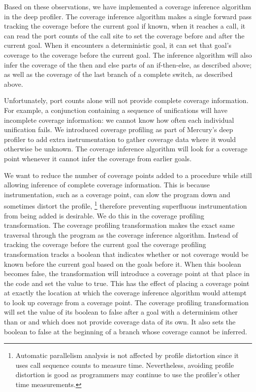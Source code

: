 Based on these observations,
we have implemented a coverage inference algorithm in the deep profiler.
The coverage inference algorithm makes a single forward pass
tracking the coverage before the current goal if known,
when it reaches a call,
it can read the port counts of the call site to set the coverage 
before and after the current goal.
When it encounters a deterministic goal,
it can set that goal's coverage to the coverage before the current goal.
The inference algorithm will also infer the coverage of the then and else
parts of an if-then-else, as described above;
as well as the coverage of the last branch of a complete switch,
as described above.

Unfortunately, port counts alone will not provide complete coverage
information.
For example, a conjunction containing a sequence of \dsemidet
unifications will have incomplete coverage information:
we cannot know how often each individual unification fails.
We introduced coverage profiling as part of Mercury's deep profiler to
add extra instrumentation to gather coverage data where it would
otherwise be unknown.
The coverage inference algorithm will look for a coverage point whenever
it cannot infer the coverage from earlier goals.

We want to reduce the number of coverage points added to a procedure while
still allowing inference of complete coverage information.
This is because instrumentation,
such as a coverage point,
can slow the program down and sometimes distort the profile,
\footnote{
    Automatic parallelism analysis is not affected by profile distortion
    since it uses call sequence counts to measure time.
    Nevertheless,
    avoiding profile distortion is good as
    programmers may continue to use the profiler's other
    time measurements.}
therefore preventing superfluous instrumentation from being added is
desirable.
We do this in the coverage profiling transformation.
The coverage profiling transformation makes the exact same traversal through
the program as the coverage inference algorithm.
Instead of tracking the coverage before the current goal
the coverage profiling transformation tracks a boolean that indicates
whether or not coverage would be known before the current goal based on the
goals before it.
When this boolean becomes false,
the transformation will introduce a coverage point at that place in the code
and set the value to true.
This has the effect of placing a coverage point at exactly the location at
which the coverage inference algorithm would attempt to look up coverage
from a coverage point.
The coverage profiling transformation will set the value of its boolean
to false after a goal with a determinism other than
\ddet or \dccmulti and which does not provide coverage data of its own.
It also sets the boolean to false at the beginning of a branch whose
coverage cannot be inferred.

